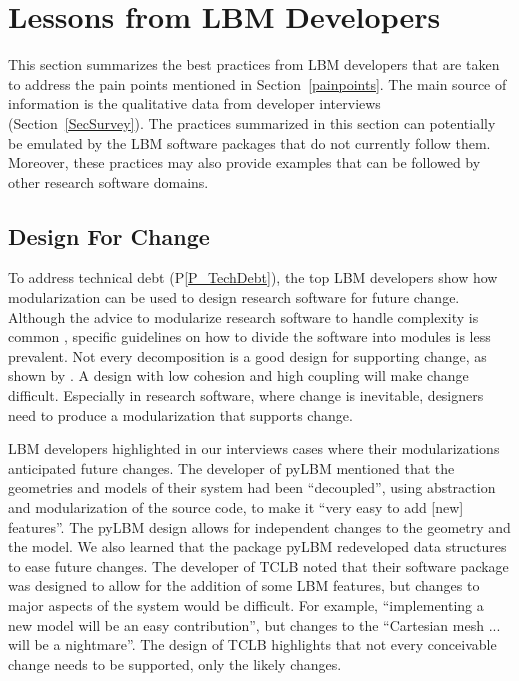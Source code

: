 \documentclass[final, 3p, times, authoryear]{elsarticle}
\newcommand{\pref}[1]{P\ref{#1}}
\begin{document}
\section{Lessons from LBM Developers} \label{Sec_AddressConcerns}

This section summarizes the best practices from LBM developers that are taken to
address the pain points mentioned in Section~\ref{painpoints}.  The main source
of information is the qualitative data from developer interviews
(Section~\ref{SecSurvey}).  The practices summarized in this section can
potentially be emulated by the LBM software packages that do not currently
follow them.  Moreover, these practices may also provide examples that can be
followed by other research software domains.

\subsection{Design For Change} \label{Sec_DesForChange}

To address technical debt (\pref{P_TechDebt}), the top LBM developers show how
modularization can be used to design research software for future change.
Although the advice to modularize research software to handle complexity is
common \citep{WilsonEtAl2014, StewartEtAl2017, Storer2017}, specific guidelines
on how to divide the software into modules is less prevalent.  Not every
decomposition is a good design for supporting change, as shown by
\citet{Parnas1972a}.  A design with low cohesion and high coupling \citep[p.\
48]{GhezziEtAl2003} will make change difficult. Especially in research software,
where change is inevitable, designers need to produce a modularization that
supports change. 

LBM developers highlighted in our interviews cases where their modularizations
anticipated future changes.  The developer of pyLBM mentioned that the
geometries and models of their system had been ``decoupled'', using abstraction
and modularization of the source code, to make it ``very easy to add [new]
features''.  The pyLBM design allows for independent changes to the geometry and
the model.  We also learned that the package pyLBM redeveloped data structures
to ease future changes. The developer of TCLB noted that their software package
was designed to allow for the addition of some LBM features, but changes to
major aspects of the system would be difficult. For example, ``implementing a
new model will be an easy contribution'', but changes to the ``Cartesian mesh
... will be a nightmare''.  The design of TCLB highlights that not every
conceivable change needs to be supported, only the likely changes.
\end{document}
